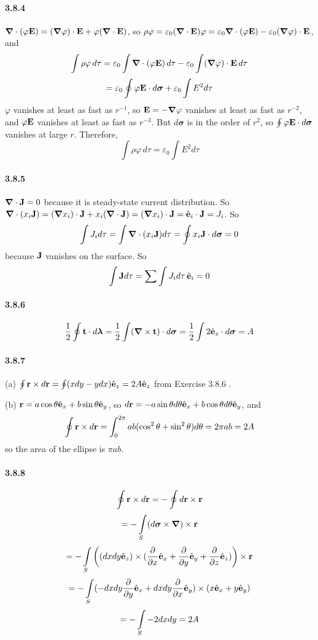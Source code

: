 \documentclass[a4paper]{article}
\begin{document}
\paragraph{3.8.4}
$\boldsymbol{\nabla}\cdot(\varphi\mathbf{E})=(\boldsymbol{\nabla}\varphi)\cdot\mathbf{E}+\varphi(\boldsymbol{\nabla}\cdot\mathbf{E})$, so $\rho\varphi=\varepsilon_0(\boldsymbol{\nabla}\cdot\mathbf{E})\varphi=\varepsilon_0\boldsymbol{\nabla}\cdot(\varphi\mathbf{E})-\varepsilon_0(\boldsymbol{\nabla}\varphi)\cdot\mathbf{E}$, and
\[
\int \rho\varphi\,d\tau=\varepsilon_0\int\boldsymbol{\nabla}\cdot(\varphi\mathbf{E})\,d\tau-\varepsilon_0\int(\boldsymbol{\nabla}\varphi)\cdot\mathbf{E}\,d\tau
\]
\[
=\varepsilon_0\oint\varphi\mathbf{E}\cdot d\boldsymbol{\sigma}+\varepsilon_0\int E^2 d\tau
\]
$\varphi$ vanishes at least as fast as $r^{-1}$, so $\mathbf{E}=-\boldsymbol{\nabla}\varphi$ vanishes at least as fast as $r^{-2}$, and $\varphi\mathbf{E}$ vanishes at least as fast as $r^{-3}$. But $d\boldsymbol{\sigma}$ is in the order of $r^2$, so $\oint\varphi\mathbf{E}\cdot d\boldsymbol{\sigma}$ vanishes at large $r$. Therefore, 
\[
\int \rho\varphi\,d\tau=\varepsilon_0\int E^2 d\tau
\]

\paragraph{3.8.5}
$\boldsymbol{\nabla}\cdot\mathbf{J}=0$ because it is steady-state current distribution. So $\boldsymbol{\nabla}\cdot(x_i\mathbf{J})=(\boldsymbol{\nabla} x_i)\cdot\mathbf{J}+x_i(\boldsymbol{\nabla}\cdot\mathbf{J})=(\boldsymbol{\nabla} x_i)\cdot\mathbf{J}=\hat{\mathbf{e}}_i\cdot\mathbf{J}=J_i$. So 
\[
\int J_i d\tau=\int\boldsymbol{\nabla}\cdot(x_i\mathbf{J})d\tau
=\oint x_i\mathbf{J}\cdot d\boldsymbol{\sigma}=0
\]
because $\mathbf{J}$ vanishes on the surface. So 
\[
\int\mathbf{J}d\tau=\sum\int J_i d\tau\,\hat{\mathbf{e}}_i=0
\]

\paragraph{3.8.6}
\[
\frac{1}{2}\oint \mathbf{t}\cdot d\boldsymbol{\lambda}=\frac{1}{2}\int(\boldsymbol{\nabla}\times\mathbf{t})\cdot d\boldsymbol{\sigma}=\frac{1}{2}\int2\hat{\mathbf{e}}_z\cdot d\boldsymbol{\sigma}=A
\]

\paragraph{3.8.7}
(a) $\oint\mathbf{r}\times d\mathbf{r}=\oint(xdy-ydx)\hat{\mathbf{e}}_z=2A\hat{\mathbf{e}}_z$ from Exercise 3.8.6 .
\medskip

(b) $\mathbf{r}=a\cos\theta\hat{\mathbf{e}}_x+b\sin\theta\hat{\mathbf{e}}_y$, so $d\mathbf{r}=-a\sin\theta d\theta\hat{\mathbf{e}}_x+b\cos\theta d\theta\hat{\mathbf{e}}_y$, and 
\[
\oint\mathbf{r}\times d\mathbf{r}=\int_0^{2\pi}ab(\cos^2\theta+\sin^2\theta)d\theta=2\pi ab=2A
\]
so the area of the ellipse is $\pi ab$.

\paragraph{3.8.8}
\[
\oint\mathbf{r}\times d\mathbf{r}=-\oint d\mathbf{r}\times\mathbf{r}
\]
\[
=-\int\displaylimits_S(d\boldsymbol{\sigma}\times\boldsymbol{\nabla})\times\mathbf{r}
\]
\[
=-\int\displaylimits_S\left((dxdy\hat{\mathbf{e}}_z)\times(\frac{\partial}{\partial x}\hat{\mathbf{e}}_x+\frac{\partial}{\partial y}\hat{\mathbf{e}}_y+\frac{\partial}{\partial z}\hat{\mathbf{e}}_z)\right)\times\mathbf{r}
\]
\[
=-\int\displaylimits_S(-dxdy\frac{\partial}{\partial y}\hat{\mathbf{e}}_x+dxdy\frac{\partial}{\partial x}\hat{\mathbf{e}}_y)\times(x\hat{\mathbf{e}}_x+y\hat{\mathbf{e}}_y)
\]
\[
=-\int\displaylimits_S -2dxdy=2A
\]
\end{document}
